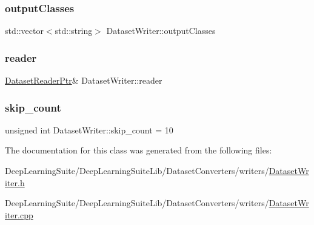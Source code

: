 \subsubsection{\texorpdfstring{output\+Classes}{outputClasses}}
{\footnotesize\ttfamily std\+::vector$<$std\+::string$>$ Dataset\+Writer\+::output\+Classes\hspace{0.3cm}{\ttfamily [protected]}}

\mbox{\label{class_dataset_writer_a2edef70c0de507a2e056eb3984705811}} 
\subsubsection{\texorpdfstring{reader}{reader}}
{\footnotesize\ttfamily \hyperlink{_dataset_reader_8h_a30d89cba514a220d64d04535c0465f1c}{Dataset\+Reader\+Ptr}\& Dataset\+Writer\+::reader\hspace{0.3cm}{\ttfamily [protected]}}

\mbox{\label{class_dataset_writer_a2c5c9a2670a4acb12278284668af7970}} 
\subsubsection{\texorpdfstring{skip\+\_\+count}{skip\_count}}
{\footnotesize\ttfamily unsigned int Dataset\+Writer\+::skip\+\_\+count = 10\hspace{0.3cm}{\ttfamily [protected]}}



The documentation for this class was generated from the following files\+:\begin{DoxyCompactItemize}
\item 
Deep\+Learning\+Suite/\+Deep\+Learning\+Suite\+Lib/\+Dataset\+Converters/writers/\hyperlink{_dataset_writer_8h}{Dataset\+Writer.\+h}\item 
Deep\+Learning\+Suite/\+Deep\+Learning\+Suite\+Lib/\+Dataset\+Converters/writers/\hyperlink{_dataset_writer_8cpp}{Dataset\+Writer.\+cpp}\end{DoxyCompactItemize}
